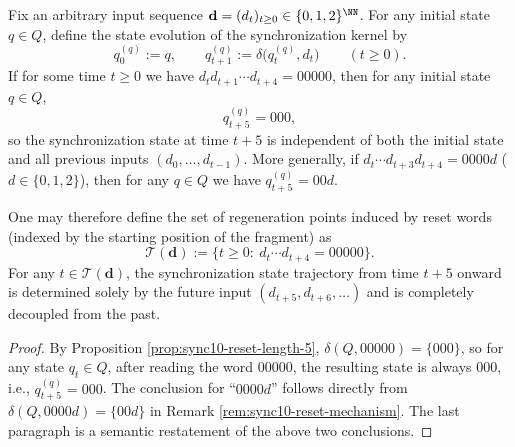 \begin{proposition}\label{prop:sync10-regeneration}
Fix an arbitrary input sequence \(\mathbf d=(d_t)_{t\ge 0}\in\{0,1,2\}^{\NN}\).
For any initial state \(q\in Q\), define the state evolution of the synchronization kernel by
\[
q^{(q)}_0:=q,\qquad q^{(q)}_{t+1}:=\delta\!\bigl(q^{(q)}_t,d_t\bigr)\qquad(t\ge 0).
\]
If for some time \(t\ge 0\) we have \(d_t d_{t+1}\cdots d_{t+4}=00000\), then for any initial state \(q\in Q\),
\[
q^{(q)}_{t+5}=000,
\]
so the synchronization state at time \(t+5\) is independent of both the initial state and all previous inputs \((d_0,\dots,d_{t-1})\).
More generally, if \(d_t\cdots d_{t+3}d_{t+4}=0000d\) (\(d\in\{0,1,2\}\)), then for any \(q\in Q\) we have \(q^{(q)}_{t+5}=00d\).
\par
One may therefore define the set of regeneration points induced by reset words (indexed by the starting position of the fragment) as
\[
\mathcal T(\mathbf d):=\{t\ge 0:\ d_t\cdots d_{t+4}=00000\}.
\]
For any \(t\in\mathcal T(\mathbf d)\), the synchronization state trajectory from time \(t+5\) onward is determined solely by the future input \((d_{t+5},d_{t+6},\dots)\) and is completely decoupled from the past.
\end{proposition}
\begin{proof}
By Proposition \ref{prop:sync10-reset-length-5}, \(\delta(Q,00000)=\{000\}\), so for any state \(q_t\in Q\), after reading the word \(00000\), the resulting state is always \(000\), i.e., \(q^{(q)}_{t+5}=000\).
The conclusion for ``\(0000d\)'' follows directly from \(\delta(Q,0000d)=\{00d\}\) in Remark \ref{rem:sync10-reset-mechanism}.
The last paragraph is a semantic restatement of the above two conclusions. \qedhere
\end{proof}

